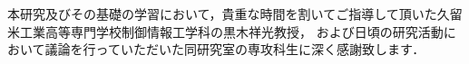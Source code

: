 \begin{ack}
本研究及びその基礎の学習において，貴重な時間を割いてご指導して頂いた久留米工業高等専門学校制御情報工学科の黒木祥光教授，
および日頃の研究活動において議論を行っていただいた同研究室の専攻科生に深く感謝致します．
\end{ack}
